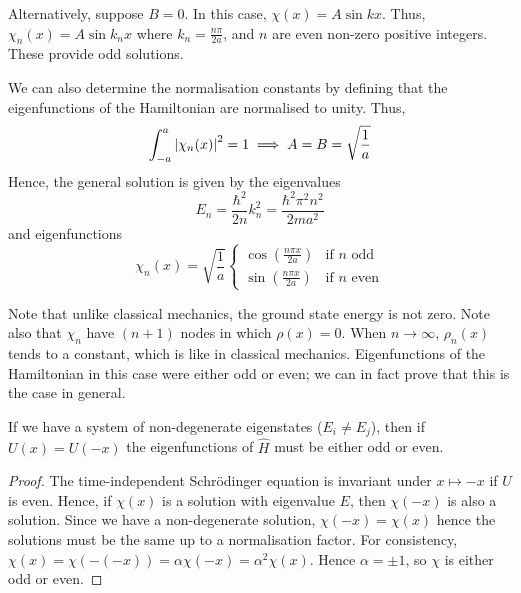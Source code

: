 Alternatively, suppose \( B = 0 \).
In this case, \( \chi(x) = A \sin kx \).
Thus, \( \chi_n(x) = A \sin k_n x \) where \( k_n = \frac{n \pi}{2a} \), and \( n \) are even non-zero positive integers.
These provide odd solutions.

We can also determine the normalisation constants by defining that the eigenfunctions of the Hamiltonian are normalised to unity.
Thus,
\[
	\int_{-a}^a \abs{\chi_n(x)}^2 = 1 \implies A = B = \sqrt{\frac{1}{a}}
\]
Hence, the general solution is given by the eigenvalues
\[
	E_n = \frac{\hbar^2}{2n} k_n^2 = \frac{\hbar^2 \pi^2 n^2}{2ma^2}
\]
and eigenfunctions
\[
	\chi_n(x) = \sqrt{\frac{1}{a}} \begin{cases}
		\cos(\frac{n \pi x}{2a}) & \text{if } n \text{ odd}  \\
		\sin(\frac{n \pi x}{2a}) & \text{if } n \text{ even}
	\end{cases}
\]
\begin{remark}
	Note that unlike classical mechanics, the ground state energy is not zero.
	Note also that \( \chi_n \) have \( (n+1) \) nodes in which \( \rho(x) = 0 \).
	When \( n \to \infty \), \( \rho_n(x) \) tends to a constant, which is like in classical mechanics.
	Eigenfunctions of the Hamiltonian in this case were either odd or even; we can in fact prove that this is the case in general.
\end{remark}
\begin{proposition}
	If we have a system of non-degenerate eigenstates (\( E_i \neq E_j \)),  then if \( U(x) = U(-x) \) the eigenfunctions of \( \hat H \) must be either odd or even.
\end{proposition}
\begin{proof}
	The time-independent Schr\"odinger equation is invariant under \( x \mapsto -x \) if \( U \) is even.
	Hence, if \( \chi(x) \) is a solution with eigenvalue \( E \), then \( \chi(-x) \) is also a solution.
	Since we have a non-degenerate solution, \( \chi(-x) = \chi(x) \) hence the solutions must be the same up to a normalisation factor.
	For consistency, \( \chi(x) = \chi(-(-x)) = \alpha \chi(-x) = \alpha^2 \chi(x) \).
	Hence \( \alpha = \pm 1 \), so \( \chi \) is either odd or even.
\end{proof}

